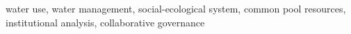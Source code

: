 water use, water management, social-ecological system, common pool resources, institutional analysis, collaborative governance
